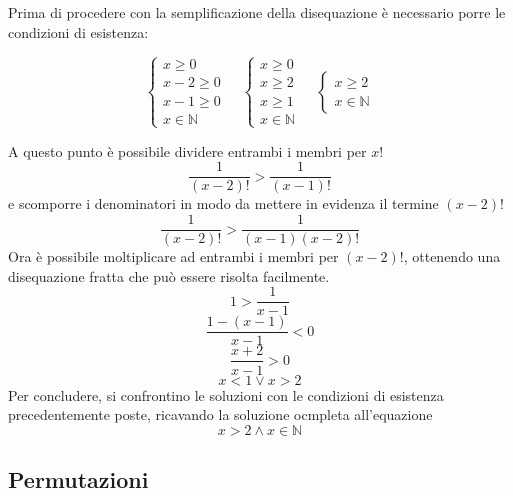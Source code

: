 \documentclass{article}     %
\begin{document}
            \begin{ex}
            
            
            Prima di procedere con la semplificazione della disequazione è necessario porre le condizioni di esistenza:

            \[ \left\{
            \begin{array}{c}
                 x\geq 0 \\
                 x-2\geq 0 \\
                 x-1\geq 0 \\
                 x \in \mathbb{N}
            \end{array} \right. ~~~~~
            \left\{
            \begin{array}{c}
                 x\geq 0 \\
                 x\geq 2 \\
                 x\geq 1\\
                 x \in \mathbb{N}
            \end{array} \right. ~~~~~
            \left\{
            \begin{array}{c}
                x\geq 2\\
                x \in \mathbb{N}
           \end{array} \right.
           \]
           
           A questo punto è possibile dividere entrambi i membri per $x!$ \[\frac{1}{(x-2)!}>\frac{1}{(x-1)!}\] e scomporre i denominatori in modo da mettere in evidenza il termine $(x-2)!$ \[\frac{1}{(x-2)!}>\frac{1}{(x-1)(x-2)!}\]
           Ora è possibile moltiplicare ad entrambi i membri per $(x-2)!$, ottenendo una disequazione fratta che può essere risolta facilmente. 
           \[1>\frac{1}{x-1}\] \[\frac{1-(x-1)}{x-1}<0\] \[\frac{x+2}{x-1}>0\] \[x<1 \lor x>2\]
           Per concludere, si confrontino le soluzioni con le condizioni di esistenza precedentemente poste, ricavando la soluzione ocmpleta all'equazione \[x>2 \land x\in \mathbb{N}\]
           \end{ex}
           \subsection{Permutazioni}
\end{document}
